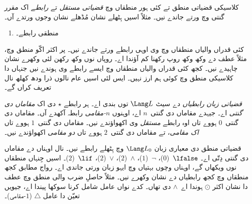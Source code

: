 \documentclass[../../../include/open-logic-section]{subfiles}
\begin{document}


کلاسیکی قضیاتی منطق تے کئی ہور منطقاں وچ \emph{قضیاتی مستقل}
تے \emph{رابطے} اک مقرر گنتی وچ ورتے جاندے نیں۔ مثلاً اسیں
ہِٹھلے نشان مُڈھلے نشان وجوں ورتدے آں۔
\begin{enumerate}
\item منطقی رابطے۔
  \startycommalist
\end{enumerate}

کئی قدراں والیاں منطقاں وچ وی اوہی رابطے ورتے جاندے نیں۔
پر اکثر اکّو منطق وچ، مثلاً عطف دے وکھ وکھ روپ رکھنا کم
آؤندا اے۔ روپاں نوں وکھ رکھن لئی وکھرے نشان چاہیدے نیں۔
کجھ کئی قدراں والیاں منطقاں وچ ایسے رابطے وی ہوندے نیں
جنہاں دا کلاسیکی منطق وچ کوئی ہم ارز نہیں۔ ایس لئی اسیں
عام نالوں ذرا ودھ کھلھ نال تعریف کراں گے۔

\begin{defn}
  \emph{قضیاتی زبان} \emph{رابطیاں} دے سیٹ $\Lang L$ توں
  بندی اے۔ ہر رابطے $\star$ دی اک \emph{مقاماں دی گنتی} اے۔
  جیہدے مقاماں دی گنتی~$n$ اے، اوہنوں \emph{$n$-مقامی} رابطہ
  آکھدے آں۔ مقاماں دی گنتی~$0$ ہووے تاں اوہ رابطے
  \emph{مستقل} وی اکھواؤندے نیں۔ مقاماں دی گنتی~$1$ ہووے
  تاں \emph{اک مقامی}، تے مقاماں دی گنتی~$2$ ہووے تاں
  \emph{دو مقامی} اکھواؤندے نیں۔
\end{defn}

\begin{ex}
  قضیاتی منطق دی معیاری زبان $\Lang L_0$ وچ ہِٹھلے رابطے نیں۔
  نال اوہناں دے مقاماں دی گنتی دِتّی اے۔
  $\lfalse$~($0$)،
  $\lnot$~($1$)،
  $\land$~($2$)،
  $\lor$~($2$)،
  $\lif$~($2$)۔ اسیں جِنہاں منطقاں نوں ویکھاں گے، اوہناں
  وچوں بہتیاں وچ ایہو زبان ورتی جاندی اے۔ رواج مطابق کجھ
  منطقاں وچ کجھ رابطیاں دے نشان وکھرے نیں۔ مثلاً حاصلِ ضرب
  والی منطق وچ عطف دا نشان اکثر $\odot$ ہوندا اے~$\land$
  دی تھاں۔ کدے نواں عامل شامل کرنا سوکھا پیندا اے، جیویں
  تعیّن دا عامل $\triangle$ ($1$-مقامی)۔
\end{ex}
\end{document}

